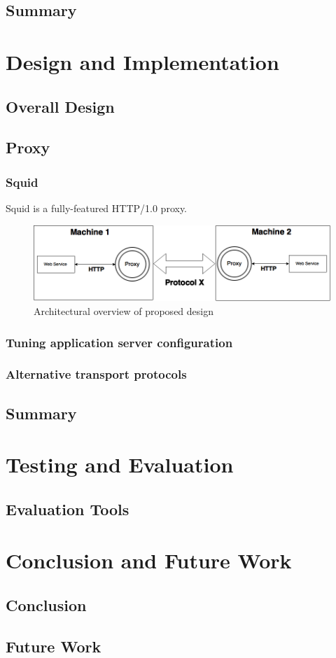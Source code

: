 \documentclass[USenglish]{ifimaster}
\begin{document}
\section{Summary}



\chapter{Design and Implementation}
\section{Overall Design}
\section{Proxy}
\subsection{Squid}
Squid is a fully-featured HTTP/1.0 proxy.
\begin{figure}[h]
\includegraphics[scale=0.4]{images/architecture.png}
\caption{Architectural overview of proposed design}
\end{figure}



\subsection{Tuning application server configuration}

\subsection{Alternative transport protocols}

\section{Summary}

\chapter{Testing and Evaluation}
\section{Evaluation Tools}

\chapter{Conclusion and Future Work}
\section{Conclusion}

\section{Future Work}

\pagebreak
\printbibliography{}
\printglossary
\end{document}
